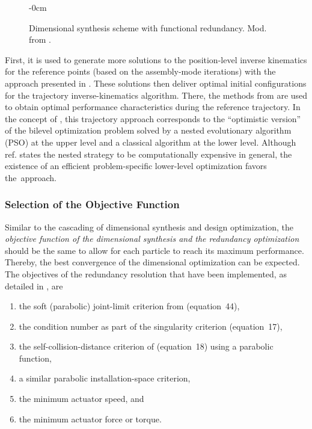 \vspace{-3pt}
\begin{figure}[H]
\begin{adjustwidth}{-\extralength}{0cm}
\centering
\graphicspath{{./Figures/}}

\end{adjustwidth}
\caption{Dimensional synthesis scheme with functional redundancy. Mod. from \cite{Schappler2022_ARK3T1R}.}
\label{fig:optimization_flowchart_taskred}
\end{figure}
%
First, it is used to generate more solutions to the position-level inverse kinematics for the reference points (based on the assembly-mode iterations) with the approach presented in \cite{SchapplerTapOrt2019c}.
These solutions then deliver optimal initial configurations for the trajectory inverse-kinematics algorithm.
There, the methods from \cite{Schappler2023_ICINCOLNEE} are used to obtain optimal performance characteristics during the reference trajectory.
In the concept of \cite{SinhaMalDeb2017}, this trajectory approach corresponds to the ``optimistic version'' of the bilevel optimization problem solved by a nested evolutionary algorithm (PSO) at the upper level and a classical algorithm at the lower level.
Although ref. \cite{SinhaMalDeb2017} states the nested strategy to be computationally expensive in general, the existence of an efficient problem-specific lower-level optimization favors the~approach.

\subsubsection{{Selection of the Objective Function}}
%
Similar to the cascading of dimensional synthesis and design optimization, the \emph{objective function of the dimensional synthesis and the redundancy optimization} should be the same to allow for each particle to reach its maximum performance.
Thereby, the best convergence of the dimensional optimization can be expected.
The objectives of the redundancy resolution that have been implemented, as detailed in \cite{Schappler2023_ICINCOLNEE}, are

\begin{enumerate}
\item \label{itm:ikobj_jointlim} the soft (parabolic) joint-limit criterion from \cite{SchapplerTapOrt2019c} (equation~44), %
%
\item \label{itm:ikobj_jac} the  condition number as part of the singularity criterion \cite{Schappler2023_ICINCOLNEE} (equation~17), %
\item \label{itm:ikobj_colldist} the self-collision-distance criterion of \cite{Schappler2023_ICINCOLNEE} (equation~18) using a parabolic function,
\item \label{itm:ikobj_instspc} a similar parabolic installation-space criterion,
\item \label{itm:ikobj_actvelo} the minimum actuator speed, and
\item \label{itm:ikobj_actforce} the minimum actuator force or torque.
\end{enumerate}


